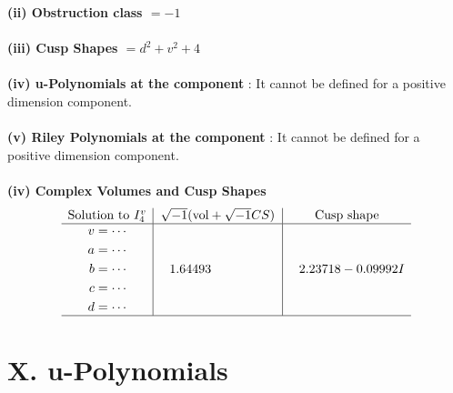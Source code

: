\documentclass[1p]{elsarticle_modified}
\theoremstyle{definition}
\newcommand{\I}{\sqrt{-1}}
\begin{document}
\flushleft \textbf{(ii) Obstruction class $= -1$}\\~\\
\flushleft \textbf{(iii) Cusp Shapes $= d^2+v^2+4$}\\~\\
\flushleft \textbf{(iv) u-Polynomials at the component} : It cannot be defined for a positive dimension component.\\~\\
\flushleft \textbf{(v) Riley Polynomials at the component} : It cannot be defined for a positive dimension component.\\~\\
\newpage\flushleft \textbf{(iv) Complex Volumes and Cusp Shapes}
$$\begin{array}{c|c|c} 
\text{Solution to }I^v_{4}& \I (\text{vol} + \sqrt{-1}CS) & \text{Cusp shape}\\
 \hline 
\begin{aligned}
v &= \cdots \\
a &= \cdots \\
b &= \cdots \\
c &= \cdots \\
d &= \cdots\end{aligned}
 & \phantom{-}1.64493\phantom{ +0.000000I} & \phantom{-}2.23718 - 0.09992 I\\
 \hline 
 \end{array}
$$
\newpage\renewcommand{\arraystretch}{1}
\centering \section*{ X. u-Polynomials}
\end{document}
